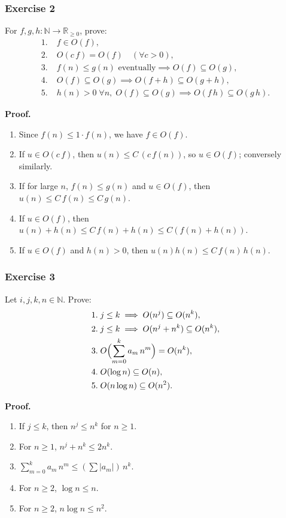 \documentclass{article}
\begin{document}
\subsubsection{Exercise 2}
For \(f,g,h\colon\mathbb N\to\mathbb R_{\ge0}\), prove:
\[
\begin{aligned}
1.\;&f\in O(f),\\
2.\;&O(c\,f)=O(f)\quad(\forall c>0),\\
3.\;&f(n)\le g(n)\text{ eventually}\implies O(f)\subseteq O(g),\\
4.\;&O(f)\subseteq O(g)\implies O(f+h)\subseteq O(g+h),\\
5.\;&h(n)>0\;\forall n,\;O(f)\subseteq O(g)\implies O(f\,h)\subseteq O(g\,h).
\end{aligned}
\]

\textbf{Proof.}
\begin{enumerate}[label=\arabic*.]
  \item Since \(f(n)\le1\cdot f(n)\), we have \(f\in O(f)\).
  \item If \(u\in O(c\,f)\), then \(u(n)\le C\,(c\,f(n))\), so \(u\in O(f)\); conversely similarly.
  \item If for large \(n\), \(f(n)\le g(n)\) and \(u\in O(f)\), then \(u(n)\le C\,f(n)\le C\,g(n)\).
  \item If \(u\in O(f)\), then \(u(n)+h(n)\le C\,f(n)+h(n)\le C(f(n)+h(n))\).
  \item If \(u\in O(f)\) and \(h(n)>0\), then \(u(n)h(n)\le C\,f(n)\,h(n)\).
\end{enumerate}

\subsubsection{Exercise 3}
Let \(i,j,k,n\in\mathbb N\).  Prove:
\[
\begin{aligned}
1.\;&j\le k\implies O(n^j)\subseteq O(n^k),\\
2.\;&j\le k\implies O(n^j+n^k)\subseteq O(n^k),\\
3.\;&O\Bigl(\sum_{m=0}^k a_m\,n^m\Bigr)=O(n^k),\\
4.\;&O(\log n)\subseteq O(n),\\
5.\;&O(n\log n)\subseteq O(n^2).
\end{aligned}
\]

\textbf{Proof.}
\begin{enumerate}[label=\arabic*.]
  \item If \(j\le k\), then \(n^j\le n^k\) for \(n\ge1\).
  \item For \(n\ge1\), \(n^j+n^k\le2n^k\).
  \item \(\sum_{m=0}^k a_m\,n^m\le(\sum|a_m|)\,n^k\).
  \item For \(n\ge2\), \(\log n\le n\).
  \item For \(n\ge2\), \(n\log n\le n^2\).
\end{enumerate}
\end{document}
